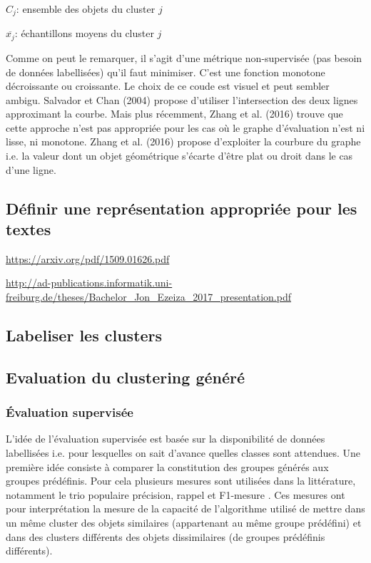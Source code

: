 $C_j$: ensemble des objets du cluster $j$

$\overline{x_j}$: échantillons moyens du cluster $j$

Comme on peut le remarquer, il s’agit d’une métrique non-supervisée (pas besoin de données labellisées) qu’il faut minimiser. C’est une fonction monotone décroissante ou croissante. Le choix de ce coude est visuel et peut sembler ambigu. Salvador et Chan (2004) propose d’utiliser l’intersection des deux lignes approximant la courbe. Mais plus récemment, Zhang et al. (2016) trouve que cette approche n’est pas appropriée pour les cas où le graphe d’évaluation n’est ni lisse, ni monotone. Zhang et al. (2016) propose d’exploiter la courbure du graphe i.e. la valeur dont un objet géométrique s'écarte d'être plat ou droit dans le cas d'une ligne.

\subsection{Définir une représentation appropriée pour les textes}
\url{https://arxiv.org/pdf/1509.01626.pdf}

\url{http://ad-publications.informatik.uni-freiburg.de/theses/Bachelor_Jon_Ezeiza_2017_presentation.pdf}


\subsection{Labeliser les clusters}

\subsection{Evaluation du clustering généré}
\subsubsection{Évaluation supervisée}
L'idée de l'évaluation supervisée est basée sur la disponibilité de données labellisées i.e. pour lesquelles on sait d'avance quelles classes sont attendues. Une première idée consiste à comparer la constitution des groupes générés aux groupes prédéfinis. Pour cela plusieurs mesures sont utilisées dans la littérature, notamment le trio populaire précision, rappel et F1-mesure . Ces mesures ont pour interprétation la mesure de la capacité de l'algorithme utilisé de mettre dans un même cluster des objets similaires (appartenant au même groupe prédéfini) et dans des clusters différents des objets dissimilaires (de groupes prédéfinis différents). 
  
